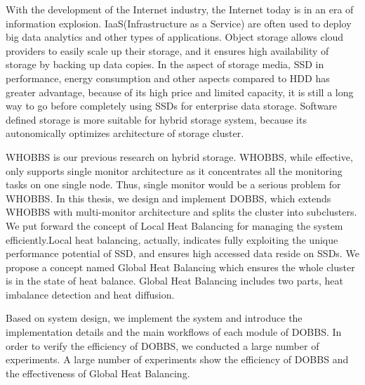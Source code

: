 \begin{englishabstract}
    With the development of the Internet industry, the Internet today is in an era of information explosion. IaaS(Infrastructure as a Service)
    are often used to deploy big data analytics and other types of applications. Object storage allows cloud providers to easily scale up their storage, 
    and it ensures high availability of storage by backing up data copies. In the aspect of storage media, SSD in performance, energy consumption and other 
    aspects compared to HDD has greater advantage, because of its high price and limited capacity, it is still a long way to go before completely using SSDs 
    for enterprise data storage. Software defined storage is more suitable for hybrid storage system, because its autonomically optimizes architecture of 
    storage cluster.

    WHOBBS\cite{lingxuan2015whobbs} is our previous research on hybrid storage. WHOBBS, while effective, only supports single monitor architecture as it 
    concentrates all the monitoring tasks on one single node. Thus, single monitor would be a serious problem for WHOBBS. In this thesis, we design and implement
    DOBBS, which extends WHOBBS with multi-monitor architecture and splits the cluster into subclusters. We put forward the concept of Local Heat Balancing for 
    managing the system efficiently.Local heat balancing, actually, indicates fully exploiting the unique performance potential of SSD, and ensures high accessed data 
    reside on SSDs. We propose a concept named Global Heat Balancing which ensures the whole cluster is in the state of heat balance. Global Heat Balancing includes two parts,
    heat imbalance detection and heat diffusion. 

    Based on system design, we implement the system and introduce the implementation details and the main workflows of each module of DOBBS. In order to verify the efficiency of 
    DOBBS, we conducted a large number of experiments. A large number of experiments show the efficiency of DOBBS and the effectiveness of Global Heat Balancing.

\end{englishabstract}

